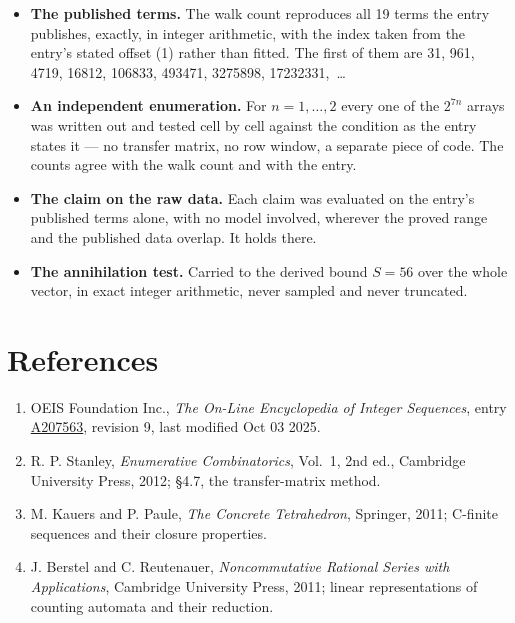 \documentclass[11pt]{article}
\theoremstyle{definition}
\begin{document}
\begin{itemize}

\item {\bfseries The published terms.} The walk count reproduces all 19 terms the entry publishes, exactly, in integer arithmetic, with the index taken from the entry's stated offset (1) rather than fitted. The first of them are 31, 961, 4719, 16812, 106833, 493471, 3275898, 17232331,~\dots

\item {\bfseries An independent enumeration.} For $n = 1,\dots,2$ every one of the $2^{7n}$ arrays was written out and tested cell by cell against the condition as the entry states it --- no transfer matrix, no row window, a separate piece of code. The counts agree with the walk count and with the entry.

\item {\bfseries The claim on the raw data.} Each claim was evaluated on the entry's published terms alone, with no model involved, wherever the proved range and the published data overlap. It holds there.

\item {\bfseries The annihilation test.} Carried to the derived bound $S = 56$ over the whole vector, in exact integer arithmetic, never sampled and never truncated.

\end{itemize}

\section{References}

\begin{enumerate}

\item OEIS Foundation Inc., \emph{The On-Line Encyclopedia of Integer Sequences}, entry \href{https://oeis.org/A207563}{A207563}, revision 9, last modified Oct 03 2025.

\item R. P. Stanley, \emph{Enumerative Combinatorics}, Vol.~1, 2nd ed., Cambridge University Press, 2012; \S4.7, the transfer-matrix method.

\item M. Kauers and P. Paule, \emph{The Concrete Tetrahedron}, Springer, 2011; C-finite sequences and their closure properties.

\item J. Berstel and C. Reutenauer, \emph{Noncommutative Rational Series with Applications}, Cambridge University Press, 2011; linear representations of counting automata and their reduction.

\end{enumerate}
\end{document}
